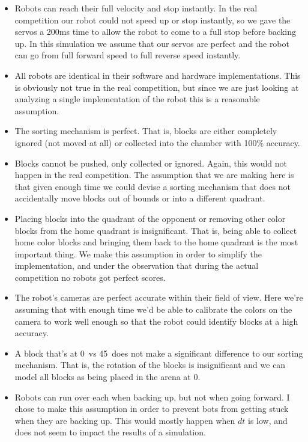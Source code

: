\documentclass[12pt]{article}
\begin{document}
\begin{itemize}
  \item Robots can reach their full velocity and stop instantly. In the real competition our robot could not speed up or stop instantly, so we gave the servos a 200ms time to allow the robot to come to a full stop before backing up. In this simulation we assume that our servos are perfect and the robot can go from full forward speed to full reverse speed instantly.
  \item All robots are identical in their software and hardware implementations. This is obviously not true in the real competition, but since we are just looking at analyzing a single implementation of the robot this is a reasonable assumption.
  \item The sorting mechanism is perfect. That is, blocks are either completely ignored (not moved at all) or collected into the chamber with 100\% accuracy.
  \item Blocks cannot be pushed, only collected or ignored. Again, this would not happen in the real competition. The assumption that we are making here is that given enough time we could devise a sorting mechanism that does not accidentally move blocks out of bounds or into a different quadrant.
  \item Placing blocks into the quadrant of the opponent or removing other color blocks from the home quadrant is insignificant. That is, being able to collect home color blocks and bringing them back to the home quadrant is the most important thing. We make this assumption in order to simplify the implementation, and under the observation that during the actual competition no robots got perfect scores.
  \item The robot's cameras are perfect accurate within their field of view. Here we're assuming that with enough time we'd be able to calibrate the colors on the camera to work well enough so that the robot could identify blocks at a high accuracy.
  \item A block that's at 0\degree\ vs 45\degree\ does not make a significant difference to our sorting mechanism. That is, the rotation of the blocks is insignificant and we can model all blocks as being placed in the arena at 0\degree.
  \item Robots can run over each when backing up, but not when going forward. I chose to make this assumption in order to prevent bots from getting stuck when they are backing up. This would mostly happen when $dt$ is low, and does not seem to impact the results of a simulation.
\end{itemize}
\end{document}
